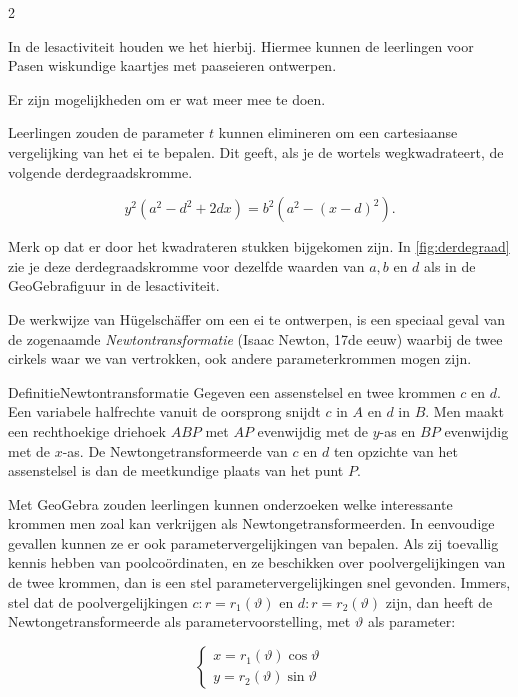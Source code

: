 \begin{multicols}{2}

In de lesactiviteit houden we het hierbij. Hiermee kunnen de leerlingen voor Pasen wiskundige kaartjes met paaseieren ontwerpen.

Er zijn mogelijkheden om er wat meer mee te doen.

Leerlingen zouden de parameter $t$ kunnen elimineren om een cartesiaanse vergelijking van het ei te bepalen. Dit geeft, als je de wortels wegkwadrateert, de volgende derdegraadskromme.

$$ y^2 \left(a^2-d^2+2d x\right) = b^2\left(a^2-(x-d)^2\right).$$


Merk op dat er door het kwadrateren stukken bijgekomen zijn. In \autoref{fig:derdegraad} zie je deze derdegraadskromme voor dezelfde waarden van $a,b$ en $d$ als in de GeoGebrafiguur in de lesactiviteit.

De werkwijze van Hügelschäffer om een ei te ontwerpen, is een speciaal geval van de zogenaamde \emph{Newtontransformatie} (Isaac Newton, 17de eeuw) waarbij de twee cirkels waar we van vertrokken, ook andere parameterkrommen mogen zijn.

	\begin{kader}{Definitie}{Newtontransformatie}
		Gegeven een assenstelsel en twee krommen $c$ en $d$. Een variabele halfrechte vanuit de oorsprong snijdt $c$ in $A$ en $d$ in $B$. Men maakt een rechthoekige driehoek $ABP$ met $AP$ evenwijdig met de $y$-as en $BP$ evenwijdig met de $x$-as. De Newtongetransformeerde van $c$ en $d$ ten opzichte van het assenstelsel is dan de meetkundige plaats van het punt $P$.
	\end{kader}


Met GeoGebra zouden leerlingen kunnen onderzoeken welke interessante krommen men zoal kan verkrijgen als Newtongetransformeerden. In eenvoudige gevallen kunnen ze er ook parametervergelijkingen van bepalen. Als zij toevallig kennis hebben van poolcoördinaten, en ze beschikken over poolvergelijkingen van de twee krommen, dan is een stel parametervergelijkingen snel gevonden. Immers, stel dat de poolvergelijkingen $c: r=r_1 (\vartheta)$ en $d: r=r_2(\vartheta)$ zijn, dan heeft de Newtongetransformeerde als parametervoorstelling, met $\vartheta$ als parameter:

$$\left\{ 
    \begin{array}{l}
         x = r_1(\vartheta) \cos{\vartheta}\\
         y = r_2(\vartheta) \sin{\vartheta}
    \end{array}
    \right.$$


\end{multicols}
